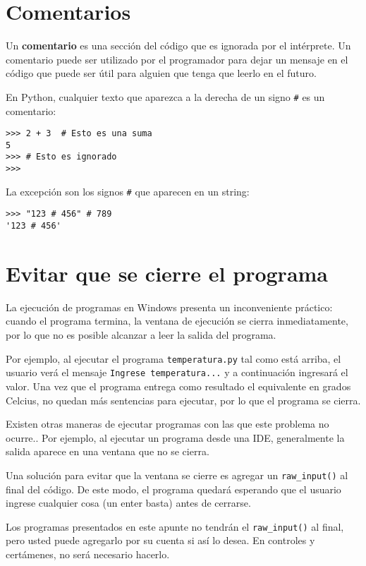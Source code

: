 \section{Comentarios}

Un \textbf{comentario} es una sección del código que es ignorada por el
intérprete. Un comentario puede ser utilizado por el programador para
dejar un mensaje en el código que puede ser útil para alguien que tenga
que leerlo en el futuro.

En Python, cualquier texto que aparezca a la derecha de un signo
\lstinline!#! es un comentario:

\begin{lstlisting}
>>> 2 + 3  # Esto es una suma
5
>>> # Esto es ignorado
>>>
\end{lstlisting}

La excepción son los signos \lstinline!#! que aparecen en un string:

\begin{lstlisting}
>>> "123 # 456" # 789
'123 # 456'
\end{lstlisting}

\section{Evitar que se cierre el programa}

La ejecución de programas en Windows presenta un inconveniente práctico:
cuando el programa termina, la ventana de ejecución se cierra
inmediatamente, por lo que no es posible alcanzar a leer la salida del
programa.

Por ejemplo, al ejecutar el programa \lstinline!temperatura.py! tal como
está arriba, el usuario verá el mensaje
\lstinline!Ingrese temperatura...! y a continuación ingresará el valor.
Una vez que el programa entrega como resultado el equivalente en grados
Celcius, no quedan más sentencias para ejecutar, por lo que el programa
se cierra.

Existen otras maneras de ejecutar programas con las que este problema no
ocurre.. Por ejemplo, al ejecutar un programa desde una IDE,
generalmente la salida aparece en una ventana que no se cierra.

Una solución para evitar que la ventana se cierre es agregar un
\lstinline!raw_input()! al final del código. De este modo, el programa
quedará esperando que el usuario ingrese cualquier cosa (un enter basta)
antes de cerrarse.

Los programas presentados en este apunte no tendrán el
\lstinline!raw_input()! al final, pero usted puede agregarlo por su
cuenta si así lo desea. En controles y certámenes, no será necesario
hacerlo.
